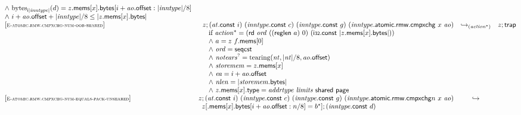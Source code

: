 $$\begin{array}[t]{@{}lrcl@{}l@{}}
{\begin{array}[t]{@{}l@{}}
{\land}~ {{\mathrm{bytes}}}_{{\mathsf{i}}{{|{\mathit{inntype}}|}}}(d) = z{.}\mathsf{mems}{}[x]{.}\mathsf{bytes}{}[i + {\mathit{ao}}{.}\mathsf{offset} : {|{\mathit{inntype}}|} / 8] \\
{\land}~ i + {\mathit{ao}}{.}\mathsf{offset} + {|{\mathit{inntype}}|} / 8 \leq {|z{.}\mathsf{mems}{}[x]{.}\mathsf{bytes}|} \\
\end{array}
} \\
{[\textsc{\scriptsize E{-}atomic.rmw.cmpxchg{-}num{-}oob{-}shared}]} \quad & z ; ({\mathit{at}}{.}\mathsf{const}~i)~({\mathit{inntype}}{.}\mathsf{const}~c)~({\mathit{inntype}}{.}\mathsf{const}~g)~({\mathit{inntype}}{.}\mathsf{atomic}{.}\mathsf{rmw}{.}\mathsf{cmpxchg}~x~{\mathit{ao}}) & {\hookrightarrow}_{({{\mathit{action}}^\ast})} {} & z ; \mathsf{trap} &  \\
& \multicolumn{4}{@{}l@{}}{\quad
\quad
\begin{array}[t]{@{}l@{}}
\mbox{if}~ {{\mathit{action}}^\ast} = (\mathsf{rd}~{\mathit{ord}}~((\mathsf{reglen}~a)~0)~(\mathsf{i{\scriptstyle 32}}{.}\mathsf{const}~{|z{.}\mathsf{mems}{}[x]{.}\mathsf{bytes}|})) \\
{\land}~ a = z~f{.}\mathsf{mems}{}[0] \\
{\land}~ {\mathit{ord}} = \mathsf{seqcst} \\
{\land}~ {{\mathit{notears}}^?} = {\mathrm{tearing}}({\mathit{nt}}, {|{\mathit{nt}}|} / 8, {\mathit{ao}}{.}\mathsf{offset}) \\
{\land}~ {\mathit{storemem}} = z{.}\mathsf{mems}{}[x] \\
{\land}~ {\mathit{ea}} = i + {\mathit{ao}}{.}\mathsf{offset} \\
{\land}~ {\mathit{nlen}} = {|{\mathit{storemem}}{.}\mathsf{bytes}|} \\
{\land}~ z{.}\mathsf{mems}{}[x]{.}\mathsf{type} = {\mathit{addrtype}}~{\mathit{limits}}~\mathsf{shared}~\mathsf{page} \\
\end{array}
} \\
{[\textsc{\scriptsize E{-}atomic.rmw.cmpxchg{-}num{-}equals{-}pack{-}unshared}]} \quad & z ; ({\mathit{at}}{.}\mathsf{const}~i)~({\mathit{inntype}}{.}\mathsf{const}~c)~({\mathit{inntype}}{.}\mathsf{const}~g)~({{\mathit{inntype}}{.}\mathsf{atomic}{.}\mathsf{rmw}{.}\mathsf{cmpxchg}}{n}~x~{\mathit{ao}}) & \hookrightarrow & & \\
& \multicolumn{4}{@{}l@{}}{\quad
\begin{array}[t]{@{}l@{}l@{}l@{}}
z{}[{.}\mathsf{mems}{}[x]{.}\mathsf{bytes}{}[i + {\mathit{ao}}{.}\mathsf{offset} : n / 8] = {b^\ast}] ; ({\mathit{inntype}}{.}\mathsf{const}~d) & & \\

\end{array}}
\end{array}$$
